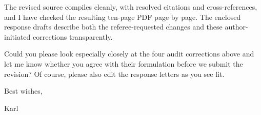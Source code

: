 \documentclass[11pt]{article}
\begin{document}
The revised source compiles cleanly, with resolved citations and cross-references, and I have checked the resulting ten-page PDF page by page.  The enclosed response drafts describe both the referee-requested changes and these author-initiated corrections transparently.

Could you please look especially closely at the four audit corrections above and let me know whether you agree with their formulation before we submit the revision?  Of course, please also edit the response letters as you see fit.

Best wishes,

Karl
\end{document}
